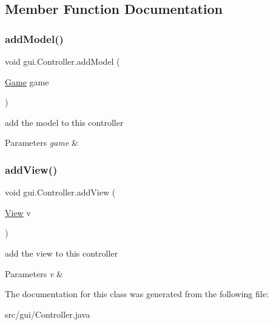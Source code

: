 \subsection{Member Function Documentation}
\mbox{\label{classgui_1_1_controller_a1b2b2a3f3ae423f0469883a0a67fa6d0}} 
\subsubsection{\texorpdfstring{add\+Model()}{addModel()}}
{\footnotesize\ttfamily void gui.\+Controller.\+add\+Model (\begin{DoxyParamCaption}\item[{\mbox{\hyperlink{classgui_1_1_game}{Game}}}]{game }\end{DoxyParamCaption})}

add the model to this controller 
\begin{DoxyParams}{Parameters}
{\em game} & \\
\hline
\end{DoxyParams}
\mbox{\label{classgui_1_1_controller_a0bd70d2ab1480738e959182941b5acfb}} 
\subsubsection{\texorpdfstring{add\+View()}{addView()}}
{\footnotesize\ttfamily void gui.\+Controller.\+add\+View (\begin{DoxyParamCaption}\item[{\mbox{\hyperlink{classgui_1_1_view}{View}}}]{v }\end{DoxyParamCaption})}

add the view to this controller 
\begin{DoxyParams}{Parameters}
{\em v} & \\
\hline
\end{DoxyParams}


The documentation for this class was generated from the following file\+:\begin{DoxyCompactItemize}
\item 
src/gui/Controller.\+java\end{DoxyCompactItemize}
